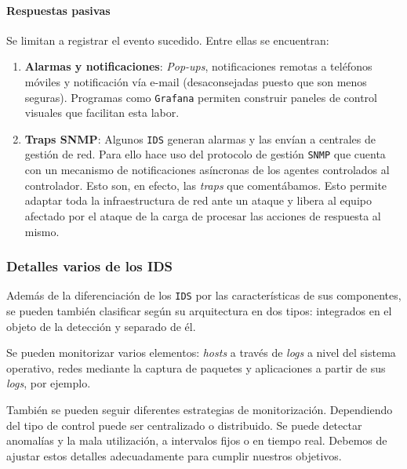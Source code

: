 \documentclass[12pt]{article}
\newcommand{\newpar} {
    \vskip 0.5cm
}
\begin{document}
                \paragraph{Respuestas pasivas}
                    Se limitan a registrar el evento sucedido. Entre ellas se encuentran:

                    \begin{enumerate}
                        \item \textbf{Alarmas y notificaciones}: \textit{Pop-ups}, notificaciones remotas a teléfonos móviles y notificación vía e-mail (desaconsejadas puesto que son menos seguras). Programas como \texttt{Grafana} permiten construir paneles de control visuales que facilitan esta labor.
                        \item \textbf{Traps SNMP}: Algunos \texttt{IDS} generan alarmas y las envían a centrales de gestión de red. Para ello hace uso del protocolo de gestión \texttt{SNMP} que cuenta con un mecanismo de notificaciones asíncronas de los agentes controlados al controlador. Esto son, en efecto, las \textit{traps} que comentábamos. Esto permite adaptar toda la infraestructura de red ante un ataque y libera al equipo afectado por el ataque de la carga de procesar las acciones de respuesta al mismo.
                    \end{enumerate}

            \subsubsection{Detalles varios de los IDS}
                Además de la diferenciación de los \texttt{IDS} por las características de sus componentes, se pueden también clasificar según su arquitectura en dos tipos: integrados en el objeto de la detección y separado de él.

                \newpar

                Se pueden monitorizar varios elementos: \textit{hosts} a través de \textit{logs} a nivel del sistema operativo, redes mediante la captura de paquetes y aplicaciones a partir de sus \textit{logs}, por ejemplo.

                \newpar

                También se pueden seguir diferentes estrategias de monitorización. Dependiendo del tipo de control puede ser centralizado o distribuido. Se puede detectar anomalías y la mala utilización, a intervalos fijos o en tiempo real. Debemos de ajustar estos detalles adecuadamente para cumplir nuestros objetivos.
\end{document}
